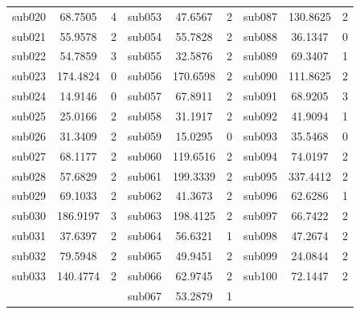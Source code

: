 \documentclass[bwprint]{gmcmthesis}
\begin{document}
\begin{table}[!ht]
\begin{spacing}{0.7}
\begin{tabular}{ccccccccc}
        sub020 & 68.7505 & 4 & sub053 & 47.6567 & 2 & sub087 & 130.8625 & 2 \\ 
        sub021 & 55.9578 & 2 & sub054 & 55.7828 & 2 & sub088 & 36.1347 & 0 \\ 
        sub022 & 54.7859 & 3 & sub055 & 32.5876 & 2 & sub089 & 69.3407 & 1 \\ 
        sub023 & 174.4824 & 0 & sub056 & 170.6598 & 2 & sub090 & 111.8625 & 2 \\ 
        sub024 & 14.9146 & 0 & sub057 & 67.8911 & 2 & sub091 & 68.9205 & 3 \\ 
        sub025 & 25.0166 & 2 & sub058 & 31.1917 & 2 & sub092 & 41.9094 & 1 \\ 
        sub026 & 31.3409 & 2 & sub059 & 15.0295 & 0 & sub093 & 35.5468 & 0 \\ 
        sub027 & 68.1177 & 2 & sub060 & 119.6516 & 2 & sub094 & 74.0197 & 2 \\ 
        sub028 & 57.6829 & 2 & sub061 & 199.3339 & 2 & sub095 & 337.4412 & 2 \\ 
        sub029 & 69.1033 & 2 & sub062 & 41.3673 & 2 & sub096 & 62.6286 & 1 \\ 
        sub030 & 186.9197 & 3 & sub063 & 198.4125 & 2 & sub097 & 66.7422 & 2 \\ 
        sub031 & 37.6397 & 2 & sub064 & 56.6321 & 1 & sub098 & 47.2674 & 2 \\ 
        sub032 & 79.5948 & 2 & sub065 & 49.9451 & 2 & sub099 & 24.0844 & 2 \\ 
        sub033 & 140.4774 & 2 & sub066 & 62.9745 & 2 & sub100 & 72.1447 & 2 \\ 
        ~ & ~ & ~ & sub067 & 53.2879 & 1 \\ \hline
    \end{tabular}
    \end{spacing}
    
\end{table}
\end{document}
